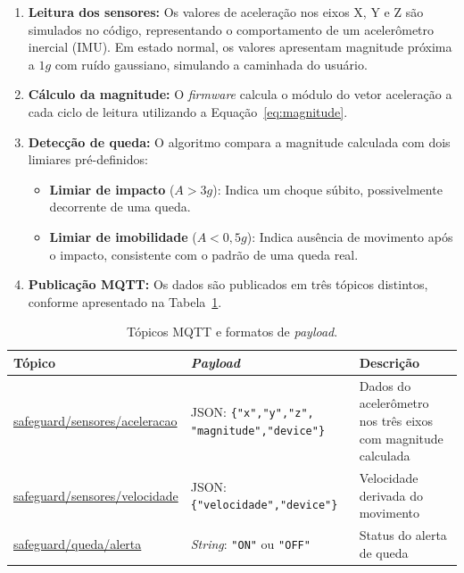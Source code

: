 \documentclass[a4paper,12pt]{article}
\begin{document}
\begin{enumerate}[leftmargin=2cm]
    \item \textbf{Leitura dos sensores:} Os valores de aceleração nos eixos X, Y e Z são simulados no código, representando o comportamento de um acelerômetro inercial (IMU). Em estado normal, os valores apresentam magnitude próxima a $1g$ com ruído gaussiano, simulando a caminhada do usuário.

    \item \textbf{Cálculo da magnitude:} O \textit{firmware} calcula o módulo do vetor aceleração a cada ciclo de leitura utilizando a Equação~\ref{eq:magnitude}.

    \item \textbf{Detecção de queda:} O algoritmo compara a magnitude calculada com dois limiares pré-definidos:
    \begin{itemize}
        \item \textbf{Limiar de impacto} ($A > 3g$): Indica um choque súbito, possivelmente decorrente de uma queda.
        \item \textbf{Limiar de imobilidade} ($A < 0{,}5g$): Indica ausência de movimento após o impacto, consistente com o padrão de uma queda real.
    \end{itemize}

    \item \textbf{Publicação MQTT:} Os dados são publicados em três tópicos distintos, conforme apresentado na Tabela~\ref{tab:topicos}.
\end{enumerate}

\begin{table}[H]
\centering
\caption{Tópicos MQTT e formatos de \textit{payload}.}
\label{tab:topicos}
\footnotesize
\begin{tabular}{p{4cm}p{4.5cm}p{5.5cm}}
\toprule
\textbf{Tópico} & \textbf{\textit{Payload}} & \textbf{Descrição} \\
\midrule
\url{ safeguard/sensores/aceleracao}
  & JSON: \texttt{\{"x","y","z", "magnitude","device"\}}
  & Dados do acelerômetro nos três eixos com magnitude calculada \\[0.4em]
\url{ safeguard/sensores/velocidade}
  & JSON: \texttt{\{"velocidade","device"\}}
  & Velocidade derivada do movimento \\[0.4em]
\url{ safeguard/queda/alerta}
  & \textit{String}: \texttt{"ON"} ou \texttt{"OFF"}
  & Status do alerta de queda \\
\bottomrule
\end{tabular}
\end{table}
\end{document}

